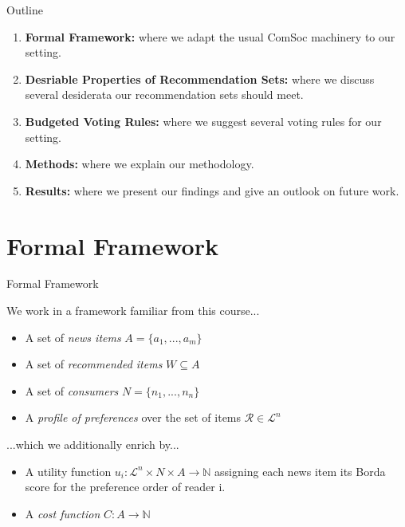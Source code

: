 \documentclass{beamer}
\begin{document}
\begin{frame}{Outline}
	
\begin{enumerate}
	\item \textbf{Formal Framework:} where we adapt the usual ComSoc machinery to our setting.

	\item \textbf{Desriable Properties of Recommendation Sets:} where we discuss several desiderata our recommendation sets should meet.
	\item \textbf{Budgeted Voting Rules:} where we suggest several voting rules for our setting.
	\item \textbf{Methods:} where we explain our methodology.
	\item \textbf{Results:} where we present our findings and give an outlook on future work. 
\end{enumerate}	
	
	
\end{frame}
	
\section{Formal Framework}

\begin{frame}{Formal Framework}
	
We work in a framework familiar from this course...
\begin{itemize}

	
\item A set of \emph {news items} $A=\{a_1,...,a_m\}$
\item A set of \emph {recommended items} $W\subseteq A$
\item A set of \emph {consumers} $N=\{n_1,...,n_n\}$
\item A \emph {profile of preferences} over the set of items
 $\mathcal{R}\in \mathcal{L}^n$

\end{itemize}

...which we additionally enrich by...
\begin{itemize}
	\item A utility function $u_i:\mathcal{L}^n \times N \times  A \rightarrow \mathbb{N}$ assigning each news item its Borda score for the preference order of reader i.
	\item A \emph{cost function} $C: A \rightarrow \mathbb {N}$
\end{itemize}

\end{frame}
\end{document}
